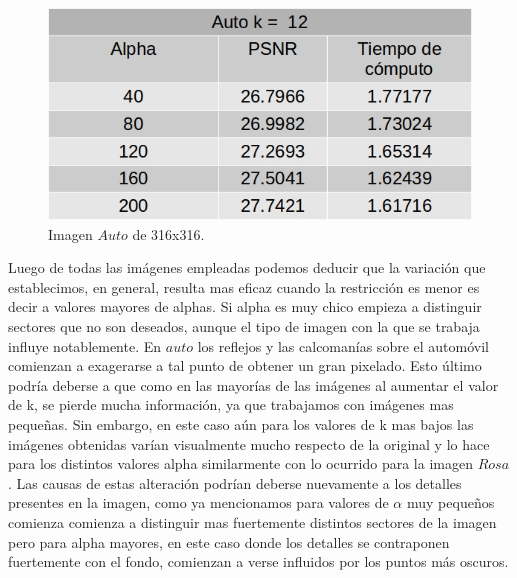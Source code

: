 \documentclass[a4paper]{article}
\begin{document}
    
    \begin{figure}[H]
    \centering
    \includegraphics[scale=0.4]{imagenes/auto12.jpg}
    \caption{Imagen $Auto$ de 316x316.}
	\label{knnTasa2}
    \end{figure}
    
 
Luego de todas las imágenes empleadas podemos deducir que la variación que establecimos, en general, resulta mas eficaz cuando la restricción es menor es decir a valores mayores de alphas. Si alpha es muy chico empieza a distinguir sectores que no son deseados, aunque el tipo de imagen con la que se trabaja influye notablemente. En $auto$ los reflejos y las calcomanías sobre el automóvil comienzan a exagerarse a tal punto de obtener un gran pixelado. Esto último podría deberse a que como en las mayorías de las imágenes al aumentar el valor de k, se pierde mucha información, ya que trabajamos con imágenes mas pequeñas. Sin embargo, en este caso a\'un para los valores de k mas bajos las imágenes obtenidas varían visualmente mucho respecto de la original y lo hace para los distintos valores alpha similarmente con lo ocurrido para la imagen $Rosa$. Las causas de estas alteración podrían deberse nuevamente a los detalles presentes en la imagen, como ya mencionamos para valores de $\alpha$ muy pequeños comienza comienza a distinguir mas fuertemente distintos sectores de la imagen pero para alpha mayores, en este caso donde los detalles se contraponen fuertemente con el fondo, comienzan a verse influidos por los puntos m\'as oscuros. 
\end{document}
